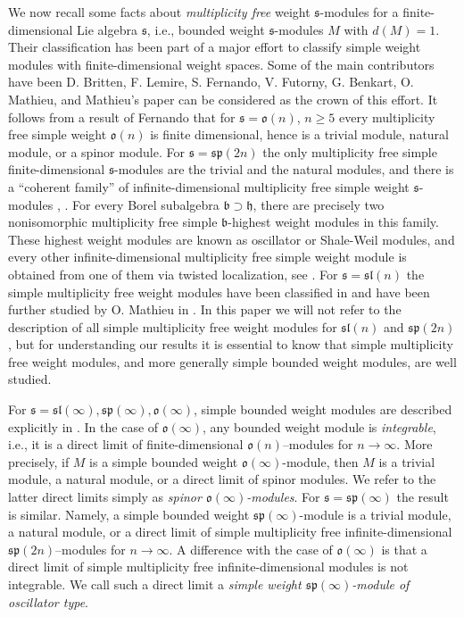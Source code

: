 \documentclass[12pt]{amsart}
\makeatletter
\def\@putname#1#2#3#4{\def\@@ref{#3}\let\old@bf\bf
        \def\bf##1{\old@bf\if?\noexpand##1?{#4}\else##1\fi}%
	#1{#2}%
        \let\bf\old@bf}
\def\@putname#1#2#3#4{\def\@@ref{#3}\let\old@bf\bf	%
	\let\old@reset@font\reset@font			%
        \def\bf##1{\old@bf\if?\noexpand##1?{#4}\else##1\fi}%
	\def\reset@font##1##2{\old@reset@font##1\if?\noexpand##2?{#4}\else##2\fi}#1{#2}%
        \let\bf\old@bf\let\reset@font\old@reset@font}
\let\my@cite=\cite
\def\cite#1{\@putname\my@cite{#1}{\@citeb}{\tiny\rm\@@ref}}
\theoremstyle{plain} %
\numberwithin{equation}{section}
\theoremstyle{definition}
\theoremstyle{remark}
\theoremstyle{plain} %
\renewcommand{\sp}{\mathfrak{sp}}
\newcommand{\so}{\mathfrak{o}}
\renewcommand{\sl}{\mathfrak{sl}}
\newcommand{\gs}{\mathfrak{s}}
\def\gs{\mathfrak{s}}
\makeatother
\begin{document}
We now recall some facts about \emph{multiplicity free} weight $\mathfrak s$-modules for a finite-dimensional Lie algebra $\mathfrak s$, i.e., bounded weight $\mathfrak s$-modules $M$ with $d(M)=1$. Their classification has been part of a major effort to classify simple weight modules with finite-dimensional weight spaces. Some of the  main contributors have  been D. Britten, F. Lemire, S. Fernando, V. Futorny, G. Benkart,  O. Mathieu, and Mathieu's paper \cite{Mat} can be considered as the crown of this effort. It follows from a result of Fernando \cite{Fer} that for $\mathfrak s = \so (n)$,
$n\geq 5$ every multiplicity free simple weight $\so (n)$ is finite dimensional, hence is a trivial module, natural module, or a spinor module. For $\mathfrak s = \sp (2n)$ the only  multiplicity free simple finite-dimensional  $\mathfrak s$-modules are the trivial and the natural modules, and there is a ``coherent family'' of infinite-dimensional multiplicity free simple weight $\mathfrak s$-modules  \cite{BBL}, \cite{Mat}. For every Borel subalgebra $\mathfrak b \supset \mathfrak h$, there are precisely two nonisomorphic multiplicity free  simple $\mathfrak b$-highest weight modules in this family. These highest weight modules are known as oscillator or Shale-Weil modules, and every other infinite-dimensional multiplicity free simple weight module is obtained from one of them via twisted localization, see \cite{Mat}. For $\gs = \sl(n)$ the simple multiplicity free 
 weight modules have been classified in \cite{BBL} and have been further studied by O. Mathieu in \cite{Mat}. In this paper we will not refer to the description of all simple multiplicity free weight modules for $\sl(n)$ and $\sp(2n)$, but for understanding our results it is essential to know that simple multiplicity free weight modules, and more generally simple bounded weight modules, are well studied. 



For $\gs = \sl(\infty), \sp (\infty), \so(\infty)$, simple bounded weight modules are described explicitly in \cite{GrP}. In the case of $\so(\infty)$, any bounded weight module is \emph{integrable}, i.e., it is a direct limit
of finite-dimensional  $\so(n)$--modules for $n \to \infty$. More precisely, if $M$ is a simple bounded  weight $\so(\infty)$-module, then $M$ is a trivial module, a natural module, or a direct limit of spinor modules. We refer to the latter direct limits simply as \emph{spinor  $\so(\infty)$-modules}. For $\gs = \sp(\infty)$ the result is similar. Namely, a simple bounded  weight  $\sp(\infty)$-module is a trivial module, a natural module, or a direct limit of simple multiplicity free infinite-dimensional  $\sp(2n)$--modules for $n \to \infty$. A difference with the case of $\so(\infty)$ is that a direct limit of simple multiplicity free infinite-dimensional modules is not integrable. We call such a direct limit a  
 \emph{simple weight $\sp(\infty)$-module of  oscillator type}. 
\end{document}

